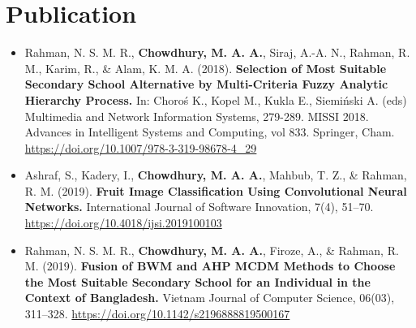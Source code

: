 \documentclass[letter-paper,10pt]{article}
\newcommand{\resumeItemWithoutHeading}[1]{
  \item\small{
    {#1 \vspace{-4pt}}
  }
}
\newcommand{\resumeSubHeadingListStart}{\begin{itemize}[leftmargin=*]}
\newcommand{\resumeSubHeadingListEnd}{\end{itemize}}
\begin{document}
\vspace{-3pt}

\section{Publication}
  \resumeSubHeadingListStart
    \resumeItemWithoutHeading
      {Rahman, N. S. M. R., \textbf{Chowdhury, M. A. A.}, Siraj, A.-A. N., Rahman, R. M., Karim, R., \& Alam, K. M. A. (2018). \textbf{Selection of Most Suitable Secondary School Alternative by Multi-Criteria Fuzzy Analytic Hierarchy Process.}  In: Choroś K., Kopel M., Kukla E., Siemiński A. (eds) Multimedia and Network Information Systems, 279-289. MISSI 2018. Advances in Intelligent Systems and Computing, vol 833. Springer, Cham. \href{https://link.springer.com/chapter/10.1007\%2F978-3-319-98678-4_29}{https://doi.org/10.1007/978-3-319-98678-4\_29}}

    \resumeItemWithoutHeading
      {Ashraf, S., Kadery, I., \textbf{Chowdhury, M. A. A.}, Mahbub, T. Z., \& Rahman, R. M. (2019). \textbf{Fruit Image Classification Using Convolutional Neural Networks.} International Journal of Software Innovation, 7(4), 51–70. \href{https://www.igi-global.com/gateway/article/236206}{https://doi.org/10.4018/ijsi.2019100103}}
      
    \resumeItemWithoutHeading
      {Rahman, N. S. M. R., \textbf{Chowdhury, M. A. A.}, Firoze, A., \& Rahman, R. M. (2019). \textbf{Fusion of BWM and AHP MCDM Methods to Choose the Most Suitable Secondary School for an Individual in the Context of Bangladesh.} Vietnam Journal of Computer Science, 06(03), 311–328. \href{https://www.worldscientific.com/doi/abs/10.1142/S2196888819500167}{https://doi.org/10.1142/s2196888819500167}}
  \resumeSubHeadingListEnd
\end{document}
